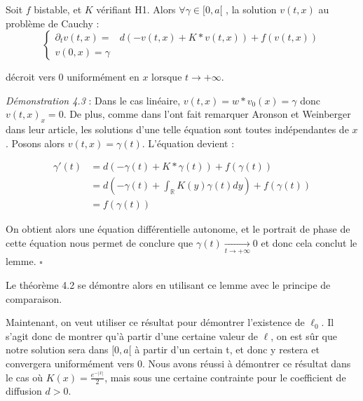 \documentclass{article}
\begin{document}
\begin{Lemme}
Soit $f$ bistable, et $K$ vérifiant H1. Alors $\forall \gamma \in [0,a[$ , la solution $v(t,x)$ au problème de Cauchy :
\begin{equation}
\left\{
\begin{array}{cc}
\partial_t v (t,x) = & d(-v(t,x) + K*v(t,x)) + f(v(t,x))\\
v(0,x) = \gamma
\end{array}
\right.
\end{equation}

\noindent décroit vers 0 uniformément en $x$ lorsque $t \rightarrow +\infty$.
\end{Lemme}

\noindent \textit{Démonstration 4.3} : Dans le cas linéaire, $v(t,x) = w*v_0(x) = \gamma $ donc $v(t,x)_x = 0$. De plus, comme dans l'ont fait remarquer Aronson et Weinberger dans leur article, les solutions d'une telle équation sont toutes indépendantes de $x$. Posons alors $v(t,x) =\gamma(t) $. L'équation devient : 

\begin{equation*}
\begin{split}
\gamma '(t) & = d(-\gamma(t) + K*\gamma(t)) +  f(\gamma(t)) \\
& = d(-\gamma(t) + \int_{\mathbb{R}}K(y)\gamma(t)dy) +  f(\gamma(t)) \\
& = f(\gamma(t))
\end{split}
\end{equation*}

On obtient alors une équation différentielle autonome, et le portrait de phase de cette équation nous permet de conclure que $\gamma(t) \underset{t \to +\infty}{\longrightarrow}0$ et donc cela conclut le lemme. $\square$ \newline 

\noindent Le théorème 4.2 se démontre alors en utilisant ce lemme avec le principe de comparaison. \newline 

Maintenant, on veut utiliser ce résultat pour démontrer l'existence de $\ell_0$. Il s'agit donc de montrer qu'à partir d'une certaine valeur de $\ell$, on est sûr que notre solution sera dans $[0,a[$ à partir d'un certain t, et donc y restera et convergera uniformément vers 0. Nous avons réussi à démontrer ce résultat dans le cas où $K(x) = \frac{e^{-|x|}}{2}$, mais sous une certaine contrainte pour le coefficient de diffusion $d>0$. \newline 
\end{document}
